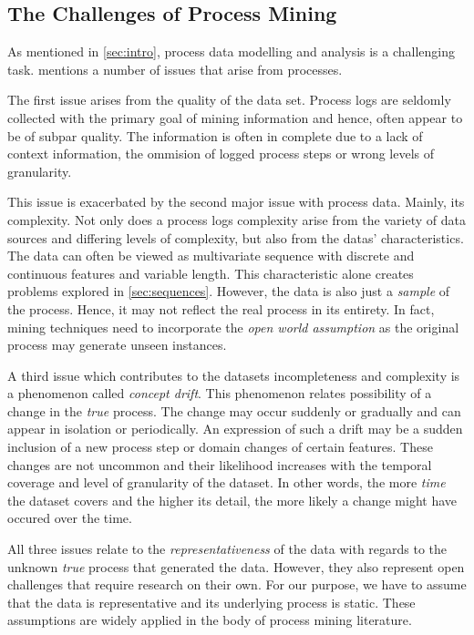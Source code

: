 \documentclass[12pt,a4paper]{report}
\begin{document}
\subsection{The Challenges of Process Mining}
As mentioned in \autoref{sec:intro}, process data modelling and analysis is a challenging task. \citeauthor{vanderaalst_ProcessMiningManifesto_2012} mentions a number of issues that arise from processes\autocite{vanderaalst_ProcessMiningManifesto_2012}.

The first issue arises from the quality of the data set. Process logs are seldomly collected with the primary goal of mining information and hence, often appear to be of subpar quality. The information is often in complete due to a lack of context information, the ommision of logged process steps or wrong levels of granularity.

This issue is exacerbated by the second major issue with process data. Mainly, its complexity. Not only does a process logs complexity arise from the variety of data sources and differing levels of complexity, but also from the datas' characteristics. The data can often be viewed as multivariate sequence with discrete and continuous features and variable length. This characteristic alone creates problems explored in \autoref{sec:sequences}.  However, the data is also just a \emph{sample} of the process. Hence, it may not reflect the real process in its entirety. In fact, mining techniques need to incorporate the \emph{open world assumption} as the original process may generate unseen \glspl{instance}.

A third issue which contributes to the datasets incompleteness and complexity is a phenomenon called \emph{concept drift}. This phenomenon relates possibility of a change in the \emph{true} process. The change may occur suddenly or gradually and can appear in isolation or periodically. An expression of such a drift may be a sudden inclusion of a new process step or domain changes of certain features. These changes are not uncommon and their likelihood increases with the temporal coverage and level of granularity of the dataset\needscite. In other words, the more \emph{time} the dataset covers and the higher its detail, the more likely a change might have occured over the time.

All three issues relate to the \emph{representativeness} of the data with regards to the unknown \emph{true} process that generated the data. However, they also represent open challenges that require research on their own. For our purpose, we have to assume that the data is representative and its underlying process is static. These assumptions are widely applied in the body of process mining literature\needscite.
\end{document}
